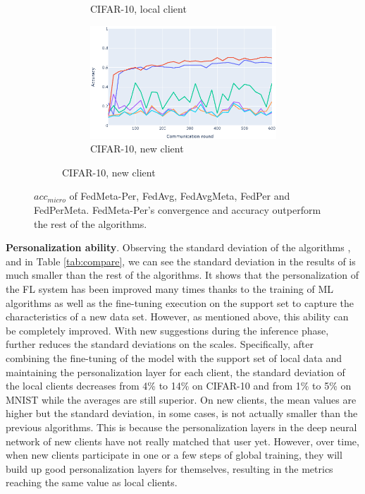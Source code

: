 \documentclass[runningheads]{llncs}
\begin{document}
\begin{figure}[h]
\begin{subfigure}{\textwidth}
\begin{subfigure}{.49\textwidth}
            \caption{CIFAR-10, local client}\label{cifar_old_per}
        \end{subfigure}
        \begin{subfigure}{.49\textwidth}
            \includegraphics[width=\linewidth]{img/cifar_new_per.eps}
            \caption{CIFAR-10, new client}\label{cifar_new_per}
        \end{subfigure}
    \end{subfigure}
    \caption{$acc_{micro}$ of FedMeta-Per, FedAvg, FedAvgMeta, FedPer and FedPerMeta. FedMeta-Per's convergence and accuracy outperform the rest of the algorithms.} \label{fig:fedpermeta_vs_chicken}
\end{figure}

\textbf{Personalization ability}. Observing the standard deviation of the algorithms ,  and  in Table \ref{tab:compare}, we can see the standard deviation in the results of  is much smaller than the rest of the algorithms. It shows that the personalization of the FL system has been improved many times thanks to the training of ML algorithms as well as the fine-tuning execution on the support set to capture the characteristics of a new data set. However, as mentioned above, this ability can be completely improved. With new suggestions during the inference phase,  further reduces the standard deviations on the scales. Specifically, after combining the fine-tuning of the model with the support set of local data and maintaining the personalization layer for each client, the standard deviation of the local clients decreases from 4\% to 14\% on CIFAR-10 and from 1\% to 5\% on MNIST while the averages are still superior. On new clients, the mean values are higher but the standard deviation, in some cases, is not actually smaller than the previous algorithms. This is because the personalization layers in the deep neural network of new clients have not really matched that user yet. However, over time, when new clients participate in one or a few steps of global training, they will build up good personalization layers for themselves, resulting in the metrics reaching the same value as local clients.
\end{document}

